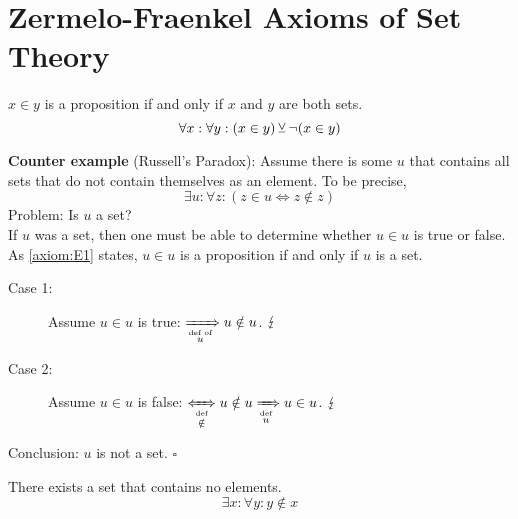 \section{Zermelo-Fraenkel Axioms of Set Theory}
\begin{axiom}\label{axiom:E1}
	\(x \in y\) is a proposition if and only if \(x\) and \(y\) are both sets.
	\begin{equation}
		\forall x: \forall y: (x \in y) \operatorname{\veebar} \lnot (x \in y)
	\end{equation}
\end{axiom}\noindent
\textsf{\textbf{Counter example} (Russell's Paradox):} Assume there is some \(u\) that contains all sets that do not contain themselves as an element. To be precise,
\begin{equation}
	\exists u: \forall z: (z \in u \iff z \notin z)
\end{equation}
Problem: Is \(u\) a set?\\
If \(u\) was a set, then one must be able to determine whether \(u \in u\) is true or false. As \cref{axiom:E1} states, \(u \in u\) is a proposition if and only if \(u\) is a set.
\begin{description}
	\item[Case 1:] Assume \(u \in u\) is true: \(\xRightarrow[\stackrel{\text{def of}}{u}]{} u \notin u\). \(\operatorname{\lightning}\)

	\item[Case 2:] Assume \(u \in u\) is false: \(\xLeftrightarrow[\stackrel{\text{def}}{\notin}]{} u \notin u \xRightarrow[\stackrel{\text{def}}{u}]{} u \in u\). \(\operatorname{\lightning}\)
\end{description}
Conclusion: \(u\) is not a set. \hfill \(\square\)

\begin{axiom}\label{axiom:E2}
	There exists a set that contains no elements.
	\begin{equation}
		\exists x: \forall y: y \notin x
	\end{equation}
\end{axiom}


